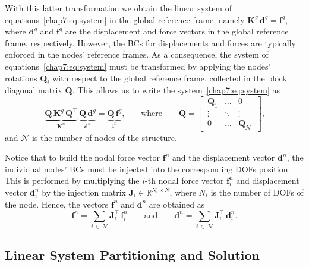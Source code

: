 With this latter transformation we obtain the linear system of equations~\eqref{chap7:eq:system} in the global reference frame, namely $\mathbf{K}^{g} \, \mathbf{d}^{g} = \mathbf{f}^{g}$, where $\mathbf{d}^{g}$ and $\mathbf{f}^{g}$ are the displacement and force vectors in the global reference frame, respectively. However, the \acp{BC} for displacements and forces are typically enforced in the nodes' reference frames. As a consequence, the system of equations~\eqref{chap7:eq:system} must be transformed by applying the nodes' rotations $\mathbf{Q}_{i}$ with respect to the global reference frame, collected in the block diagonal matrix $\mathbf{Q}$. This allows us to write the system~\eqref{chap7:eq:system} as
%
\begin{equation}
  \underbrace{\mathbf{Q} \, \mathbf{K}^{g} \, \mathbf{Q}^\top}_{\displaystyle\mathbf{K}^{n}} \, \underbrace{\mathbf{Q} \, \mathbf{d}^{g}}_{\displaystyle\mathbf{d}^{n}} = \underbrace{\mathbf{Q} \, \mathbf{f}^{g}}_{\displaystyle\mathbf{f}^{n}} \text{,} \qquad \text{where} \qquad \mathbf{Q} = \left[\,\begin{matrix}
    \mathbf{Q}_{1} & \ldots & 0 \\[0.25em]
    \vdots       & \ddots & \vdots \\[0.25em]
    0            & \ldots & \mathbf{Q}_{\mathcal{N}}
  \end{matrix}\,\right] \text{,}
\end{equation}
%
and $\mathcal{N}$ is the number of nodes of the structure.

Notice that to build the nodal force vector $\mathbf{f}^{n}$ and the displacement vector $\mathbf{d}^{n}$, the individual nodes' \acp{BC} must be injected into the corresponding \acp{DOF} position. This is performed by multiplying the $i$-th nodal force vector $\mathbf{f}^{n}_{i}$ and displacement vector $\mathbf{d}^{n}_{i}$ by the injection matrix $\mathbf{J}_{i} \in \mathbb{R}^{N_i \times N}$, where $N_i$ is the number of \acp{DOF} of the node. Hence, the vectors $\mathbf{f}^{n}$ and $\mathbf{d}^{n}$ are obtained as
%
\begin{equation}
  \mathbf{f}^{n} = \sum_{i \, \in \, \mathcal{N}} \mathbf{J}_{i}^\top \, \mathbf{f}^{n}_{i}
  \qquad \text{and} \qquad
  \mathbf{d}^{n} = \sum_{i \, \in \, \mathcal{N}} \mathbf{J}_{i}^\top \, \mathbf{d}^{n}_{i} \text{.}
\end{equation}

\subsection{Linear System Partitioning and Solution}

